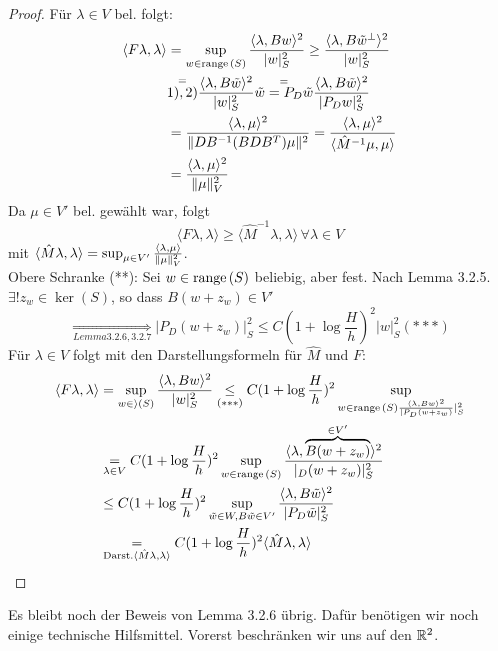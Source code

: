 \begin{proof}
Für $\lambda \in V$ bel. folgt:
\begin{align*}
\langle F\lambda , \lambda \rangle &= \sup_{w \in \textnormal{range}\, (S)} \frac{\langle \lambda, Bw \rangle^2}{|w|^2_S}  \geq \frac{\langle \lambda, B\tilde{w}^{\perp} \rangle^2 }{|w|^2_S} \\
&\overset{=}{1),2)}  \frac{\langle \lambda, B\tilde{w} \rangle^2 }{|w|^2_S} \overset{=}{\tilde w=P_D\tilde w}  \frac{\langle \lambda, B\tilde{w} \rangle^2 }{|P_D w|^2_S} \\
& =  \frac{\langle \lambda,\mu \rangle^2 }{\|DB^{-1}(BDB^T)\mu\|^2} =  \frac{\langle \lambda, \mu \rangle^2 }{\langle {\hat M}^{-1} \mu, \mu \rangle} \\
&= \frac{\langle \lambda , \mu \rangle^2 }{\|\mu\|^2_V}
\end{align*}
Da $\mu \in V'$ bel. gewählt war, folgt
\[\langle F\lambda, \lambda \rangle \geq \langle {\hat M}^{-1} \lambda ,\lambda \rangle \, \forall \lambda \in V \]
mit $\langle \hat M \lambda , \lambda \rangle = \sup_{\mu \in V'} \frac{\langle \lambda, \mu \rangle }{\|\mu\|^2_V}$.\\



  Obere Schranke (**):
Sei $w\in\textnormal{range}\,(S)$ beliebig, aber fest. Nach Lemma 3.2.5. $\exists! z_w\in\ker(S)$, so dass $B(w+z_w)\in V'$
\[
  \underset{Lemma 3.2.6,3.2.7}{\Longrightarrow} |P_D(w+z_w)|_S^2 \leq C(1+\log \frac{H}{h})^2 |w|_S^2 (***)
\]
Für $\lambda\in V$ folgt mit den Darstellungsformeln für $\hat{M}$ und $F$: 
\begin{align*}
  \langle F\lambda,\lambda\rangle &= \sup_{w\in\rangle(S)}\frac{\langle\lambda,Bw\rangle^2}{|w|_S^2} \underset{(***)}{\leq} C(1+\log \frac{H}{h})^2 \sup_{w\in\textnormal{range}\,(S)\frac{\langle\lambda,Bw\rangle^2}{|P_D(w+z_w)}|_S^2}\\
  &\underset{\lambda\in V}{=} C(1+\log \frac{H}{h})^2 \sup_{w\in\textnormal{range}\,(S)} \frac{\langle\lambda,\overbrace{B(w+z_w)}^{\in V'}\rangle^2}{|_D(w+z_w)|_S^2}\\
  &\leq C(1+\log \frac{H}{h})^2 \sup_{\tilde{w}\in W, B\tilde{w}\in V'} \frac{\langle\lambda,B\tilde{w}\rangle^2}{|P_D\tilde{w}|_S^2}\\
  &\underset{\text{Darst.} \langle\hat{M}\lambda,\lambda\rangle}{=} C(1+\log \frac{H}{h})^2 \langle\hat{M}\lambda,\lambda\rangle
\end{align*}
\end{proof}

Es bleibt noch der Beweis von Lemma 3.2.6 übrig. Dafür benötigen wir noch einige technische Hilfsmittel. Vorerst beschränken wir uns auf den $\mathbb{R}^2$. \\

